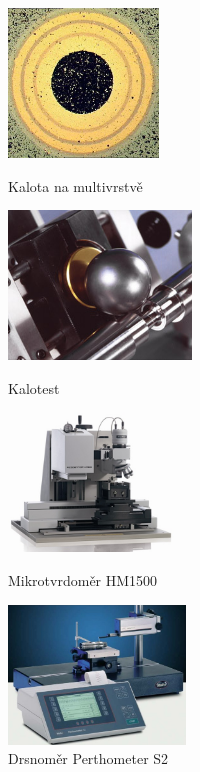 \documentclass[12pt]{article}
\begin{document}
\begin{figure}[!ht]

\begin{minipage}[b]{0.5\linewidth}
\centering
\includegraphics[height=150px]{calo_d.jpg}
\caption{Kalota na multivrstvě}
\label{kalota}
\end{minipage}
\begin{minipage}[b]{0.5\linewidth}
\centering
\includegraphics[height=150px]{calo_e.jpg}
\caption{Kalotest}
\label{kalotest}
\end{minipage}

\hspace{1.5cm}

\begin{minipage}[b]{0.5\linewidth}
\centering
\includegraphics[height=140px]{picodentor.jpg}
\caption{Mikrotvrdoměr HM1500}
\label{mikrotvrdomer}
\end{minipage}
\begin{minipage}[b]{0.5\linewidth}
\centering
\includegraphics[height=140px]{drsnomer.jpg}
\caption{Drsnoměr Perthometer S2}
\label{drsnomer}
\end{minipage}

\end{figure}
\end{document}
